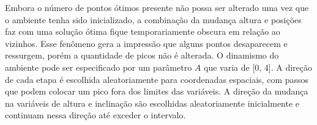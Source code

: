 Embora o número de pontos ótimos presente não possa ser alterado uma vez que o ambiente tenha sido inicializado, a combinação da mudança altura e posições faz com uma solução ótima fique temporariamente obscura em relação ao vizinhos. Esse fenômeno gera a impressão que alguns pontos desaparecem e ressurgem, porém a quantidade de picos não é alterada. O dinamismo do ambiente pode ser especificado por um parâmetro $A$ que varia de [0, 4]. A direção de cada etapa é escolhida aleatoriamente para coordenadas espaciais, com passos que podem colocar um pico fora dos limites das variáveis. A direção da mudança na variáveis de altura e inclinação são escolhidas aleatoriamente inicialmente e continuam nessa direção até exceder o intervalo.